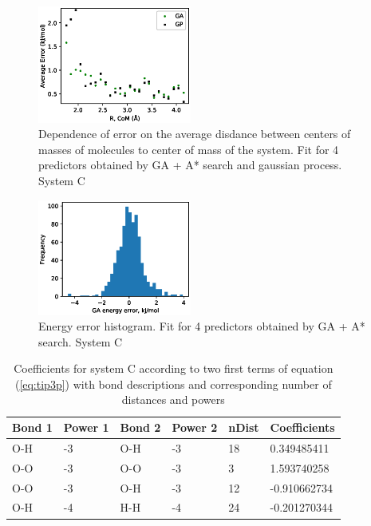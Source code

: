 \documentclass[aps,prl,reprint,amsmath,amssymb,nature]{revtex4-1}
\begin{document}
\begin{figure}
\includegraphics[width=0.45\textwidth]{media/C_Error_4_predictors.eps}
\caption{Dependence of error on the average disdance between centers of masses of molecules to center of mass of the system. Fit for 4 predictors obtained by GA + A* search and gaussian process. System C}\label{Fig:C_RMSE_4_predictors}
\end{figure}

\begin{figure}
\includegraphics[width=0.45\textwidth]{media/C_GA_energy_error_histogram_4_predictors.eps}
\caption{Energy error histogram. Fit for 4 predictors obtained by GA + A* search. System C}\label{Fig:C_histogram_4_predictors}
\end{figure}

\begin{table}[h]
\caption{Coefficients for system C according to two first terms of equation (\ref{eq:tip3p}) with bond descriptions and corresponding number of distances and powers}
\label{Tab:C coefficients}
\begin{tabular}{|l|l|l|l|l|l|}
\hline
\textbf{Bond 1} & \textbf{Power 1} & \textbf{Bond 2} & \textbf{
Power 2} & \textbf{nDist} & \textbf{
Coefficients} \\
\hline
O-H & -3 & O-H & -3 & 18 & 0.349485411 \\
\hline
O-O & -3 & O-O & -3 & 3 & 1.593740258 \\
\hline
O-O & -3 & O-H & -3 & 12 & -0.910662734 \\
\hline
O-H & -4 & H-H & -4 & 24 & -0.201270344 \\
\hline
\end{tabular}
\end{table}
\end{document}
